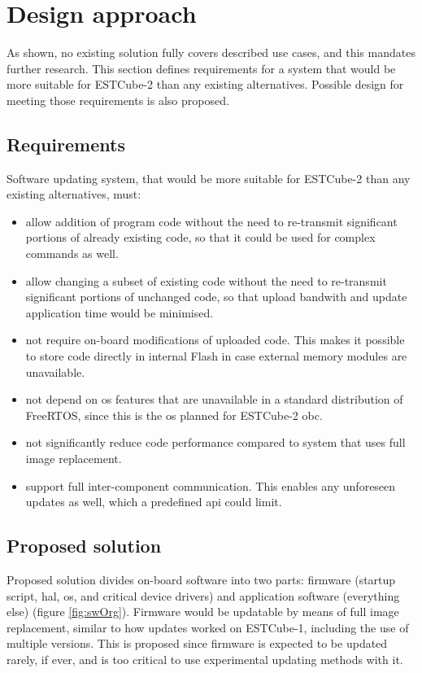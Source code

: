 \newpage
\section{Design approach}
\label{s:design}

As shown, no existing solution fully covers described use cases, and this mandates further research. This section defines requirements for a system that would be more suitable for ESTCube-2 than any existing alternatives. Possible design for meeting those requirements is also proposed.

\subsection{Requirements}

Software updating system, that would be more suitable for ESTCube-2 than any existing alternatives, must:

\begin{itemize}
	\item allow addition of program code without the need to re-transmit significant portions of already existing code, so that it could be used for complex commands as well.
	\item allow changing a subset of existing code without the need to re-transmit significant portions of unchanged code, so that upload bandwith and update application time would be minimised.
	\item not require on-board modifications of uploaded code. This makes it possible to store code directly in internal Flash in case external memory modules are unavailable.
	\item not depend on \gls{os} features that are unavailable in a standard distribution of Free\-RTOS, since this is the \gls{os} planned for ESTCube-2 \gls{obc}.
	\item not significantly reduce code performance compared to system that uses full image replacement.
	\item support full inter-component communication. This enables any unforeseen updates as well, which a predefined \gls{api} could limit.
\end{itemize}

\subsection{Proposed solution}

Proposed solution divides on-board software into two parts: firmware (startup script, \gls{hal}, \gls{os}, and critical device drivers) and application software (everything else) (figure \ref{fig:swOrg}). Firmware would be updatable by means of full image replacement, similar to how updates worked on ESTCube-1, including the use of multiple versions. This is proposed since firmware is expected to be updated rarely, if ever, and is too critical to use experimental updating methods with it.

